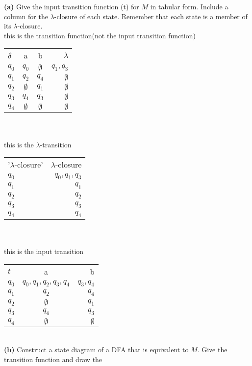 \documentclass[12pt]{article}
\begin{document}
{\bf (a)} Give the input transition function (t) for $M$ in tabular form.
Include a column for the $\lambda$-closure of each state. Remember that
each state is a member of its $\lambda$-closure.
\\this is the transition function(not the input transition function)\\
\begin{tabular}{l |c| c| r}
    $\delta$&a&b&$\lambda$\\
    $q_0$&$q_0$ &$\emptyset$ & $q_1,q_3$\\
    $q_1$& $q_2$&$q_4$ &$\emptyset$  \\
    $q_2$&$\emptyset$ &$q_1$ & $\emptyset$ \\
    $q_3$& $q_4$&$q_3$ &$\emptyset$ \\
    $q_4$& $\emptyset$&$\emptyset$ &$\emptyset$  \\

\end{tabular}
\\
\\this is the $\lambda$-transition\\
\begin{tabular}{l|r}
    '$\lambda$-closure'&$\lambda$-closure\\
    $q_0$&$q_0,q_1,q_3$\\
    $q_1$& $q_1$  \\
    $q_2$&$q_2$ \\
    $q_3$& $q_3$ \\
    $q_4$&$q_4$ \\

\end{tabular}
\\
\\this is the input transition\\
\begin{tabular}{l |c|r}
    $t$&a&b\\
    $q_0$&$q_0,q_1,q_2,q_3,q_4$ &$q_3,q_4$ \\
    $q_1$& $q_2$&$q_4$\\
    $q_2$ & $\emptyset$ &$q_1$ \\
    $q_3$& $q_4$&$q_3$  \\
    $q_4$& $\emptyset$&$\emptyset$   \\

\end{tabular}\\
{\bf (b)} Construct a state diagram of a DFA that
is equivalent to $M$. Give the transition function and draw the
\end{document}
